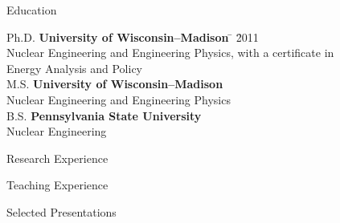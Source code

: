 \documentclass{resume2} %
\begin{document}

\begin{rSection}{Education}

\begin{tabbing}
Ph.D. \hspace*{2 em}\= \textbf{University of Wisconsin--Madison} \hspace*{5em} \= \hspace*{15em} \= 2011 \\
      \> Nuclear Engineering and Engineering Physics, with a certificate in \\ \> Energy Analysis and Policy \\
%
M.S. \hspace*{2 em}\> \textbf{University of Wisconsin--Madison} \>  \\
      \> Nuclear Engineering and Engineering Physics \\
%
B.S. \hspace*{2 em}\> \textbf{Pennsylvania State University} \>  \\
      \> Nuclear Engineering
\end{tabbing}
\end{rSection}

\begin{rSection}{Research Experience}

\end{rSection}

\begin{rSection}{Teaching Experience}

\end{rSection}

\begin{rSection}{Selected Presentations}

\end{rSection}
\end{document}
